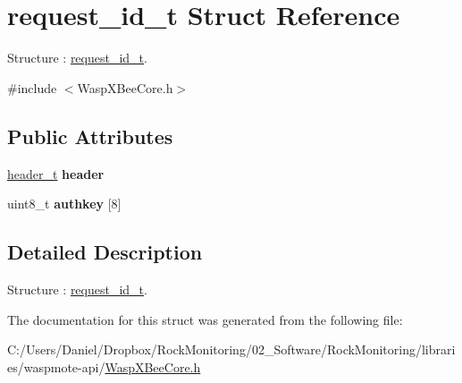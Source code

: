 \hypertarget{structrequest__id__t}{}\section{request\+\_\+id\+\_\+t Struct Reference}
\label{structrequest__id__t}


Structure \+: \hyperlink{structrequest__id__t}{request\+\_\+id\+\_\+t}.  




{\ttfamily \#include $<$Wasp\+X\+Bee\+Core.\+h$>$}

\subsection*{Public Attributes}
\begin{DoxyCompactItemize}
\item 
\hyperlink{structheader__t}{header\+\_\+t} {\bfseries header}\hypertarget{structrequest__id__t_a112f2aa0ca7ae3c1c5cd0a80a8b09d3e}{}\label{structrequest__id__t_a112f2aa0ca7ae3c1c5cd0a80a8b09d3e}

\item 
uint8\+\_\+t {\bfseries authkey} \mbox{[}8\mbox{]}\hypertarget{structrequest__id__t_a05391282d39b8a934cca6f2151d0a25e}{}\label{structrequest__id__t_a05391282d39b8a934cca6f2151d0a25e}

\end{DoxyCompactItemize}


\subsection{Detailed Description}
Structure \+: \hyperlink{structrequest__id__t}{request\+\_\+id\+\_\+t}. 

The documentation for this struct was generated from the following file\+:\begin{DoxyCompactItemize}
\item 
C\+:/\+Users/\+Daniel/\+Dropbox/\+Rock\+Monitoring/02\+\_\+\+Software/\+Rock\+Monitoring/libraries/waspmote-\/api/\hyperlink{_wasp_x_bee_core_8h}{Wasp\+X\+Bee\+Core.\+h}\end{DoxyCompactItemize}
